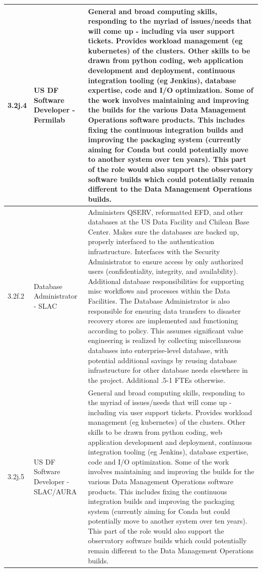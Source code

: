 \begin{longtable} {|p{}|p{}|p{}|}
{3.2j.4}&{US DF Software Developer - Fermilab}&{General and broad computing skills, responding to the myriad of issues/needs that will come up - including via user support tickets. Provides workload management (eg kubernetes) of the clusters. Other skills to be drawn from python coding, web application development and deployment, continuous integration tooling (eg Jenkins), database expertise, code and I/O optimization. Some of the work involves maintaining and improving the builds for the various Data Management Operations software products. This includes fixing the continuous integration builds and improving the packaging system (currently aiming for Conda but could potentially move to another system over ten years). This part of the role would also support the observatory software builds which could potentially remain different to the Data Management Operations builds.} \\ \hline
{3.2f.2}&{Database Administrator - SLAC}&{Administers QSERV, reformatted EFD, and other databases at the US Data Facility and Chilean Base Center. Makes sure the databases are backed up, properly interfaced to the authentication infrastructure. Interfaces with the Security Administrator to ensure access by only authorized users (confidentiality, integrity, and availability). Additional database responsibilities for supporting misc workflows and processes within the Data Facilities. The Database Administrator is also responsible for ensuring data transfers to disaster recovery stores are implemented and functioning according to policy. This assumes significant value engineering is realized by collecting miscellaneous databases into enterprise-level database, with potential additional savings by reusing database infrastructure for other database needs elsewhere in the project. Additional .5-1 FTEs otherwise.} \\ \hline
{3.2j.5}&{US DF Software Developer - SLAC/AURA}&{General and broad computing skills, responding to the myriad of issues/needs that will come up - including via user support tickets. Provides workload management (eg kubernetes) of the clusters. Other skills to be drawn from python coding, web application development and deployment, continuous integration tooling (eg Jenkins), database expertise, code and I/O optimization. Some of the work involves maintaining and improving the builds for the various Data Management Operations software products. This includes fixing the continuous integration builds and improving the packaging system (currently aiming for Conda but could potentially move to another system over ten years). This part of the role would also support the observatory software builds which could potentially remain different to the Data Management Operations builds.} \\ \hline

\end{longtable}
